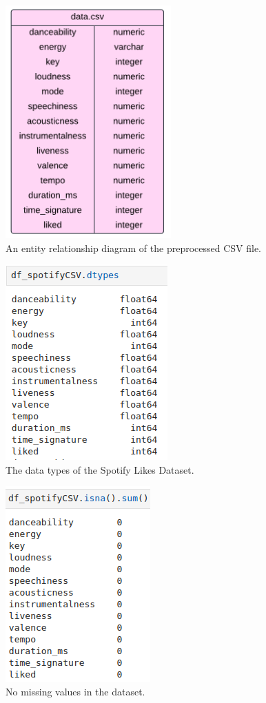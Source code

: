 \documentclass[12pt]{report}
\begin{document}
\begin{figure}[H]
    \centering
    \includegraphics[width=.5\linewidth]{Spotify-ERD.png}
    \caption{An entity relationship diagram of the preprocessed CSV file.}
    \label{fig:Spotify-ERD}
\end{figure}

\begin{figure}[H]
    \centering
    \includegraphics[width=.4\linewidth]{pandas/Spotify-DTypes.png}
    \caption{The data types of the Spotify Likes Dataset.}
    \label{fig:Spotify-DTypes}
\end{figure}

\begin{figure}[H]
    \centering
    \includegraphics[width=.4\linewidth]{pandas/Spotify-NA.png}
    \caption{No missing values in the dataset.}
    \label{fig:Spotify-NA}
\end{figure}
\end{document}
